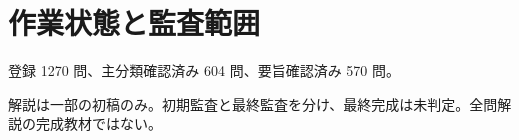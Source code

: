 \chapter{作業状態と監査範囲}
登録 1270 問、主分類確認済み 604 問、要旨確認済み 570 問。
\par 解説は一部の初稿のみ。初期監査と最終監査を分け、最終完成は未判定。全問解説の完成教材ではない。
